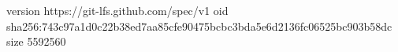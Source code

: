 version https://git-lfs.github.com/spec/v1
oid sha256:743c97a1d0c22b38ed7aa85cfe90475bcbc3bda5e6d2136fc06525bc903b58dc
size 5592560
